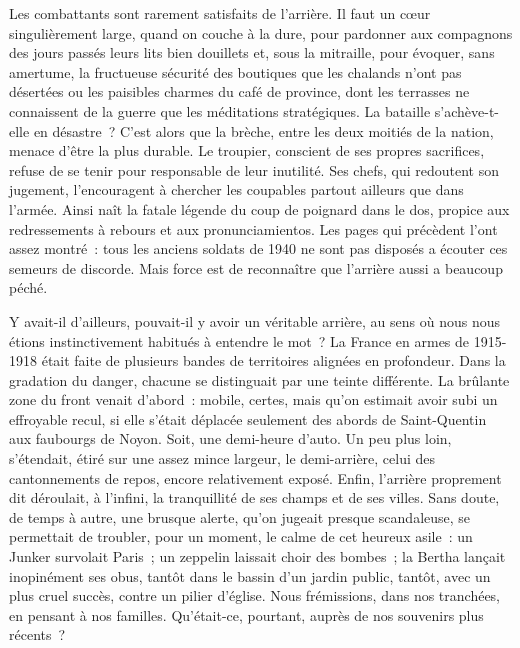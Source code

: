 \documentclass[french,twoside]{book} %
\begin{document}
\noindent Les combattants sont rarement satisfaits de l’arrière. Il faut un cœur singulièrement large, quand on couche à la dure, pour pardonner aux compagnons des jours passés leurs lits bien douillets et, sous la mitraille, pour évoquer, sans amertume, la fructueuse sécurité des boutiques que les chalands n’ont pas désertées ou les paisibles charmes du café de province, dont les terrasses ne connaissent de la guerre que les méditations stratégiques. La bataille s’achève-t-elle en désastre ? C’est alors que la brèche, entre les deux moitiés de la nation, menace d’être la plus durable. Le troupier, conscient de ses propres sacrifices, refuse de se tenir pour responsable de leur inutilité. Ses chefs, qui redoutent son jugement, l’encouragent à chercher les coupables partout ailleurs que dans l’armée. Ainsi naît la fatale légende du coup de poignard dans le dos, propice aux redressements à rebours et aux pronunciamientos. Les pages qui précèdent l’ont assez montré : tous les anciens soldats de 1940 ne sont pas disposés a écouter ces semeurs de discorde. Mais force est de reconnaître que l’arrière aussi a beaucoup péché.\par
Y avait-il d’ailleurs, pouvait-il y avoir un véritable arrière, au sens où nous nous étions instinctivement habitués à entendre le mot ? La France en armes de 1915-1918 était faite de plusieurs bandes de territoires alignées en profondeur. Dans la gradation du danger, chacune se distinguait par une   teinte différente. La brûlante zone du front venait d’abord : mobile, certes, mais qu’on estimait avoir subi un effroyable recul, si elle s’était déplacée seulement des abords de Saint-Quentin aux faubourgs de Noyon. Soit, une demi-heure d’auto. Un peu plus loin, s’étendait, étiré sur une assez mince largeur, le demi-arrière, celui des cantonnements de repos, encore relativement exposé. Enfin, l’arrière proprement dit déroulait, à l’infini, la tranquillité de ses champs et de ses villes. Sans doute, de temps à autre, une brusque alerte, qu’on jugeait presque scandaleuse, se permettait de troubler, pour un moment, le calme de cet heureux asile : un Junker survolait Paris ; un zeppelin laissait choir des bombes ; la Bertha lançait inopinément ses obus, tantôt dans le bassin d’un jardin public, tantôt, avec un plus cruel succès, contre un pilier d’église. Nous frémissions, dans nos tranchées, en pensant à nos familles. Qu’était-ce, pourtant, auprès de nos souvenirs plus récents ?\par
\end{document}
